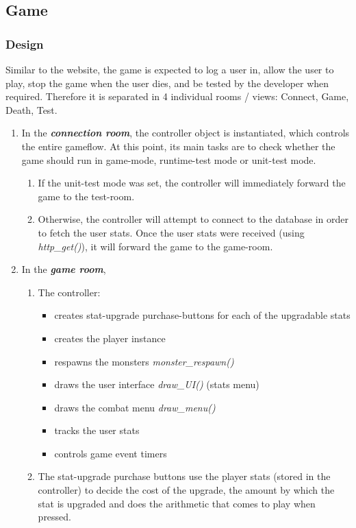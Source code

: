 \documentclass[12pt]{report}
\begin{document}
\subsection*{Game}
\subsubsection{Design}
Similar to the website, the game is expected to log a user in, allow the user to play, stop the game when the user dies, and be tested by the developer when required. Therefore it is separated in 4 individual rooms / views: Connect, Game, Death, Test.
\begin{enumerate}
\item In the \emph{\textbf{connection room}}, the controller object is instantiated, which controls the entire gameflow. At this point, its main tasks are to check whether the game should run in game-mode, runtime-test mode or unit-test mode.
\begin{enumerate}
\item If the unit-test mode was set, the controller will immediately forward the game to the test-room.
\item Otherwise, the controller will attempt to connect to the database in order to fetch the user stats. Once the user stats were received (using \textsl{http\_get()}), it will forward the game to the game-room.
\end{enumerate} 
\item In the \emph{\textbf{game room}}, 
\begin{enumerate}
\item The controller: 
\begin{itemize}
\item creates stat-upgrade purchase-buttons for each of the upgradable stats
\item creates the player instance
\item respawns the monsters \textsl{monster\_respawn()}
\item draws the user interface \textsl{draw\_UI()} (stats menu)
\item draws the combat menu \textsl{draw\_menu()}
\item tracks the user stats
\item controls game event timers
\end{itemize}  
\item The stat-upgrade purchase buttons use the player stats (stored in the controller) to decide the cost of the upgrade, the amount by which the stat is upgraded and does the arithmetic that comes to play when pressed.

\end{enumerate}
\end{enumerate}
\end{document}
